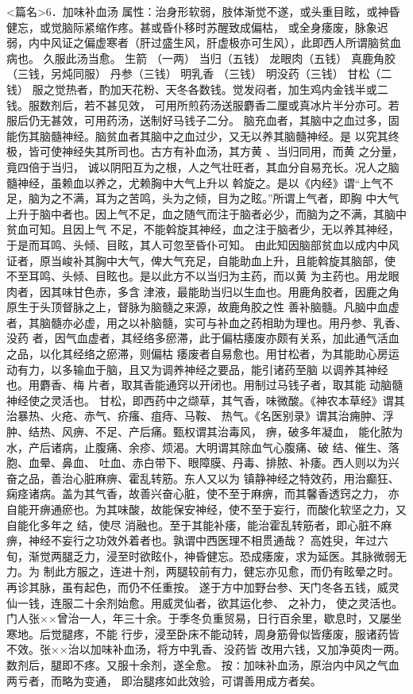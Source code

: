 \documentclass[a4paper,12pt,UTF8,twoside]{ctexbook}
\begin{document}
<篇名>6．加味补血汤
属性：治身形软弱，肢体渐觉不遂，或头重目眩，或神昏健忘，或觉脑际紧缩作疼。甚或昏仆移时苏醒致成偏枯， 
或全身痿废，脉象迟弱，内中风证之偏虚寒者（肝过盛生风，肝虚极亦可生风），此即西人所谓脑贫血病也。 
久服此汤当愈。 
生箭 （一两） 当归（五钱） 龙眼肉（五钱） 真鹿角胶（三钱，另炖同服） 丹参（三钱） 明乳香 
（三钱） 明没药（三钱） 甘松（二钱） 
服之觉热者，酌加天花粉、天冬各数钱。觉发闷者，加生鸡内金钱半或二钱。服数剂后，若不甚见效， 
可用所煎药汤送服麝香二厘或真冰片半分亦可。若服后仍无甚效，可用药汤，送制好马钱子二分。 
脑充血者，其脑中之血过多，固能伤其脑髓神经。脑贫血者其脑中之血过少，又无以养其脑髓神经。是 
以究其终极，皆可使神经失其所司也。古方有补血汤，其方黄 、当归同用，而黄 之分量，竟四倍于当归， 
诚以阴阳互为之根，人之气壮旺者，其血分自易充长。况人之脑髓神经，虽赖血以养之，尤赖胸中大气上升以 
斡旋之。是以《内经》谓“上气不足，脑为之不满，耳为之苦鸣，头为之倾，目为之眩。”所谓上气者，即胸 
中大气上升于脑中者也。因上气不足，血之随气而注于脑者必少，而脑为之不满，其脑中贫血可知。且因上气 
不足，不能斡旋其神经，血之注于脑者少，无以养其神经，于是而耳鸣、头倾、目眩，其人可忽至昏仆可知。 
由此知因脑部贫血以成内中风证者，原当峻补其胸中大气，俾大气充足，自能助血上升，且能斡旋其脑部，使 
不至耳鸣、头倾、目眩也。是以此方不以当归为主药，而以黄 为主药也。用龙眼肉者，因其味甘色赤，多含 
津液，最能助当归以生血也。用鹿角胶者，因鹿之角原生于头顶督脉之上，督脉为脑髓之来源，故鹿角胶之性 
善补脑髓。凡脑中血虚者，其脑髓亦必虚，用之以补脑髓，实可与补血之药相助为理也。用丹参、乳香、没药 
者，因气血虚者，其经络多瘀滞，此于偏枯痿废亦颇有关系，加此通气活血之品，以化其经络之瘀滞，则偏枯 
痿废者自易愈也。用甘松者，为其能助心房运动有力，以多输血于脑，且又为调养神经之要品，能引诸药至脑 
以调养其神经也。用麝香、梅 
片者，取其香能通窍以开闭也。用制过马钱子者，取其能 动脑髓神经使之灵活也。 
甘松，即西药中之缬草，其气香，味微酸。《神农本草经》谓其治暴热、火疮、赤气、疥瘙、疽痔、马鞍、 
热气。《名医别录》谓其治痈肿、浮肿、结热、风痹、不足、产后痛。甄权谓其治毒风， 痹，破多年凝血， 
能化脓为水，产后诸病，止腹痛、余疹、烦渴。大明谓其除血气心腹痛、破 结、催生、落胞、血晕、鼻血、 
吐血、赤白带下、眼障膜、丹毒、排脓、补痿。西人则以为兴奋之品，善治心脏麻痹、霍乱转筋。东人又以为 
镇静神经之特效药，用治癫狂、痫痉诸病。盖为其气香，故善兴奋心脏，使不至于麻痹，而其馨香透窍之力， 
亦自能开痹通瘀也。为其味酸，故能保安神经，使不至于妄行，而酸化软坚之力，又自能化多年之 结，使尽 
消融也。至于其能补痿，能治霍乱转筋者，即心脏不麻痹，神经不妄行之功效外着者也。孰谓中西医理不相贯通哉？ 
高姓臾，年过六旬，渐觉两腿乏力，浸至时欲眩仆，神昏健忘。恐成痿废，求为延医。其脉微弱无力。为 
制此方服之，连进十剂，两腿较前有力，健忘亦见愈，而仍有眩晕之时。再诊其脉，虽有起色，而仍不任重按。 
遂于方中加野台参、天门冬各五钱，威灵仙一钱，连服二十余剂始愈。用威灵仙者，欲其运化参、 之补力， 
使之灵活也。 
门人张××曾治一人，年三十余。于季冬负重贸易，日行百余里，歇息时，又屡坐寒地。后觉腿疼，不能 
行步，浸至卧床不能动转，周身筋骨似皆痿废，服诸药皆不效。张××治以加味补血汤，将方中乳香、没药皆 
改用六钱，又加净萸肉一两。数剂后，腿即不疼。又服十余剂，遂全愈。 
按∶加味补血汤，原治内中风之气血两亏者，而略为变通， 
即治腿疼如此效验，可谓善用成方者矣。 
\end{document}
